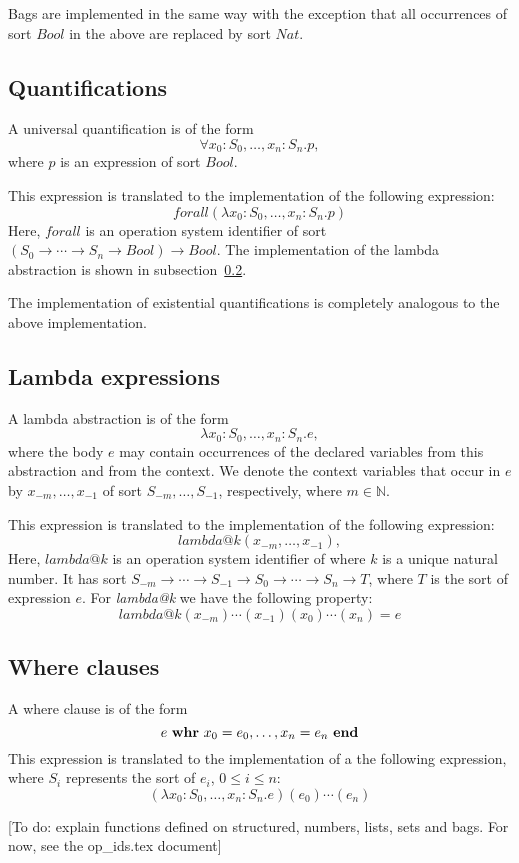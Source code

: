 \documentclass[a4paper,fleqn]{article}
\newcommand{\frm}[1]{\mbox{\ensuremath{#1}}}
\newcommand{\f}[1]{\ensuremath{\mathit{#1}}}
\newcommand{\fa}[2]{\ensuremath{\f{#1}(#2)}}
\newcommand{\nat}{\ensuremath{\mathbb{N}}}
\newcommand{\kwwhr}{{\bf whr}}
\newcommand{\kwend}{{\bf end}}
\newcommand{\srtbool}{\f{Bool}}
\newcommand{\srtnat}{\f{Nat}}
\begin{document}
Bags are implemented in the same way with the exception that all occurrences of
sort \frm{\srtbool} in the above are replaced by sort \frm{\srtnat}.

\subsection{Quantifications}

A universal quantification is of the form
\[\forall x_{0}{:}S_{0}, \ldots, x_{n}{:}S_{n}. p,\]
where \frm{p} is an expression of sort \frm{\srtbool}.

This expression is translated to the implementation of the following
expression:
\[\fa{forall}{\lambda x_{0}{:}S_{0}, \ldots, x_{n}{:}S_{n}. p}\]
Here, \frm{\f{forall}} is an operation system identifier of sort 
\frm{(S_{0} \to \cdots \to S_{n} \to \srtbool) \to \srtbool}. The
implementation of the lambda abstraction is shown in
subsection~\ref{subsec:lambda}.

The implementation of existential quantifications is completely analogous to
the above implementation.

\subsection{Lambda expressions}
\label{subsec:lambda}

A lambda abstraction is of the form
\[\lambda x_{0}{:}S_{0}, \ldots, x_{n}{:}S_{n}. e,\]
where the body \frm{e} may contain occurrences of the declared variables from
this abstraction and from the context. We denote the context variables that
occur in \frm{e} by \frm{x_{-m}, \ldots, x_{-1}} of sort \frm{S_{-m}, \ldots,
S_{-1}}, respectively, where \frm{m \in \nat}.

This expression is translated to the implementation of the following
expression:
\[\fa{lambda@k}{x_{-m}, \ldots, x_{-1}},\]
Here, \frm{\f{lambda@k}} is an operation system identifier of where \frm{k} is
a unique natural number. It has sort \frm{S_{-m} \to \cdots \to S_{-1}
\to S_{0} \to \cdots \to S_{n} \to T}, where \frm{T} is the sort of expression
\frm{e}. For \emph{lambda@k} we have the following property:
\[\mathit{lambda@k}(x_{-m})\cdots(x_{-1})(x_{0})\cdots(x_{n}) = e\]

\subsection{Where clauses}

A where clause is of the form
\[e\ \kwwhr\ x_{0} = e_{0}, \ldots, x_{n} = e_{n}\ \kwend\]
This expression is translated to the implementation of a the following
expression, where \frm{S_{i}} represents the sort of \frm{e_{i}}, \frm{0 \leq i
\leq n}:
\[(\lambda x_{0}{:}S_{0}, \ldots, x_{n}{:}S_{n}. e)(e_{0})\cdots(e_{n})\]

[To do: explain functions defined on structured, numbers, lists,
sets and bags. For now, see the op\_ids.tex document]
\end{document}
